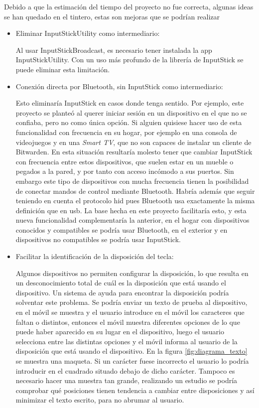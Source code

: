 Debido a que la estimación del tiempo del proyecto no fue correcta, algunas ideas se han quedado en el tintero, estas son mejoras que se podrían realizar
\begin{itemize}
    \item Eliminar InputStickUtility como intermediario:

Al usar InputStickBroadcast, es necesario tener instalada la app InputStickUtility. Con un uso más profundo de la librería de InputStick se puede eliminar esta limitación.

    \item Conexión directa por Bluetooth, sin InputStick como intermediario:
    
Esto eliminaría InputStick en casos donde tenga sentido. Por ejemplo, este proyecto se planteó al querer iniciar sesión en un dispositivo en el que no se confiaba, pero no como única opción. Si alguien quisiese hacer uso de esta funcionalidad con frecuencia en su hogar, por ejemplo en una consola de videojuegos y en una \textit{Smart TV}, que no son capaces de instalar un cliente de Bitwarden. En esta situación resultaría molesto tener que cambiar InputStick con frecuencia entre estos dispositivos, que suelen estar en un mueble o pegados a la pared, y por tanto con acceso incómodo a sus puertos. Sin embargo este tipo de dispositivos con mucha frecuencia tienen la posibilidad de conectar mandos de control mediante Bluetooth. Habría además que seguir teniendo en cuenta el protocolo \gls{hid} pues Bluetooth usa exactamente la misma definición que en \gls{usb}\cite{bluetoothhid}. La base hecha en este proyecto facilitaría esto, y esta nueva funcionalidad complementaría la anterior, en el hogar con dispositivos conocidos y compatibles se podría usar Bluetooth, en el exterior y en dispositivos no compatibles se podría usar InputStick.\newline

    \item Facilitar la identificación de la disposición del tecla:

Algunos dispositivos no permiten configurar la disposición, lo que resulta en un desconocimiento total de cuál es la disposición que está usando el dispositivo. Un sistema de ayuda para encontrar la disposición podría solventar este problema. Se podría enviar un texto de prueba al dispositivo, en el móvil se muestra  y el usuario introduce en el móvil los caracteres que faltan o distintos, entonces el móvil muestra diferentes opciones de lo que puede haber aparecido en su lugar en el dispositivo, luego el usuario selecciona entre las distintas opciones y el móvil informa al usuario de la disposición que está usando el dispositivo. En la figura \ref{fig:diagrama_texto} se muestra una maqueta. Si un carácter fuese incorrecto el usuario lo podría introducir en el cuadrado situado debajo de dicho carácter. Tampoco es necesario hacer una muestra tan grande, realizando un estudio se podría comprobar qué posiciones tienen tendencia a cambiar entre disposiciones y así minimizar el texto escrito, para no abrumar al usuario.


\end{itemize}
